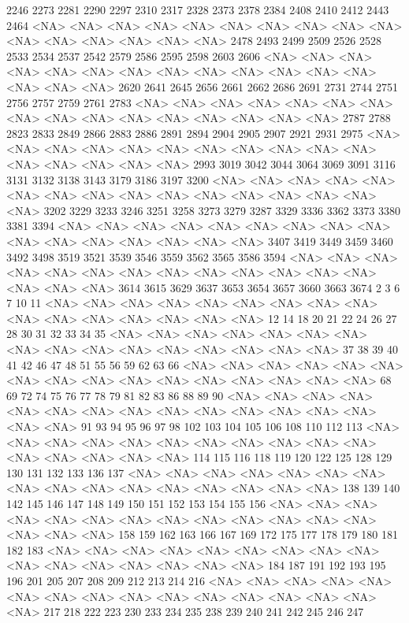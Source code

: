 \documentclass{article}
\begin{document}
\begin{Schunk}
\begin{Soutput}
2246 2273 2281 2290 2297 2310 2317 2328 2373 2378 2384 2408 2410 2412 2443 2464 
<NA> <NA> <NA> <NA> <NA> <NA> <NA> <NA> <NA> <NA> <NA> <NA> <NA> <NA> <NA> <NA> 
2478 2493 2499 2509 2526 2528 2533 2534 2537 2542 2579 2586 2595 2598 2603 2606 
<NA> <NA> <NA> <NA> <NA> <NA> <NA> <NA> <NA> <NA> <NA> <NA> <NA> <NA> <NA> <NA> 
2620 2641 2645 2656 2661 2662 2686 2691 2731 2744 2751 2756 2757 2759 2761 2783 
<NA> <NA> <NA> <NA> <NA> <NA> <NA> <NA> <NA> <NA> <NA> <NA> <NA> <NA> <NA> <NA> 
2787 2788 2823 2833 2849 2866 2883 2886 2891 2894 2904 2905 2907 2921 2931 2975 
<NA> <NA> <NA> <NA> <NA> <NA> <NA> <NA> <NA> <NA> <NA> <NA> <NA> <NA> <NA> <NA> 
2993 3019 3042 3044 3064 3069 3091 3116 3131 3132 3138 3143 3179 3186 3197 3200 
<NA> <NA> <NA> <NA> <NA> <NA> <NA> <NA> <NA> <NA> <NA> <NA> <NA> <NA> <NA> <NA> 
3202 3229 3233 3246 3251 3258 3273 3279 3287 3329 3336 3362 3373 3380 3381 3394 
<NA> <NA> <NA> <NA> <NA> <NA> <NA> <NA> <NA> <NA> <NA> <NA> <NA> <NA> <NA> <NA> 
3407 3419 3449 3459 3460 3492 3498 3519 3521 3539 3546 3559 3562 3565 3586 3594 
<NA> <NA> <NA> <NA> <NA> <NA> <NA> <NA> <NA> <NA> <NA> <NA> <NA> <NA> <NA> <NA> 
3614 3615 3629 3637 3653 3654 3657 3660 3663 3674    2    3    6    7   10   11 
<NA> <NA> <NA> <NA> <NA> <NA> <NA> <NA> <NA> <NA> <NA> <NA> <NA> <NA> <NA> <NA> 
  12   14   18   20   21   22   24   26   27   28   30   31   32   33   34   35 
<NA> <NA> <NA> <NA> <NA> <NA> <NA> <NA> <NA> <NA> <NA> <NA> <NA> <NA> <NA> <NA> 
  37   38   39   40   41   42   46   47   48   51   55   56   59   62   63   66 
<NA> <NA> <NA> <NA> <NA> <NA> <NA> <NA> <NA> <NA> <NA> <NA> <NA> <NA> <NA> <NA> 
  68   69   72   74   75   76   77   78   79   81   82   83   86   88   89   90 
<NA> <NA> <NA> <NA> <NA> <NA> <NA> <NA> <NA> <NA> <NA> <NA> <NA> <NA> <NA> <NA> 
  91   93   94   95   96   97   98  102  103  104  105  106  108  110  112  113 
<NA> <NA> <NA> <NA> <NA> <NA> <NA> <NA> <NA> <NA> <NA> <NA> <NA> <NA> <NA> <NA> 
 114  115  116  118  119  120  122  125  128  129  130  131  132  133  136  137 
<NA> <NA> <NA> <NA> <NA> <NA> <NA> <NA> <NA> <NA> <NA> <NA> <NA> <NA> <NA> <NA> 
 138  139  140  142  145  146  147  148  149  150  151  152  153  154  155  156 
<NA> <NA> <NA> <NA> <NA> <NA> <NA> <NA> <NA> <NA> <NA> <NA> <NA> <NA> <NA> <NA> 
 158  159  162  163  166  167  169  172  175  177  178  179  180  181  182  183 
<NA> <NA> <NA> <NA> <NA> <NA> <NA> <NA> <NA> <NA> <NA> <NA> <NA> <NA> <NA> <NA> 
 184  187  191  192  193  195  196  201  205  207  208  209  212  213  214  216 
<NA> <NA> <NA> <NA> <NA> <NA> <NA> <NA> <NA> <NA> <NA> <NA> <NA> <NA> <NA> <NA> 
 217  218  222  223  230  233  234  235  238  239  240  241  242  245  246  247 

\end{Soutput}
\end{Schunk}
\end{document}
